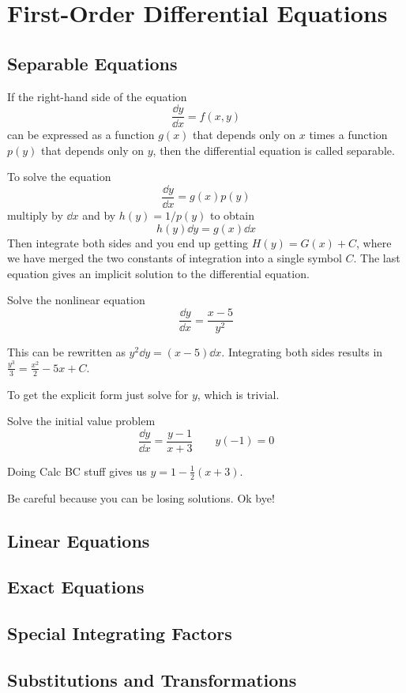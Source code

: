 \documentclass[../diffeq.tex]{subfiles}
\begin{document}
\chapter{First-Order Differential Equations}
\section{Separable Equations}
\begin{definition}
    If the right-hand side of the equation 
    \[ \frac{\dd y}{\dd x}=f(x,y) \]
    can be expressed as a function $g(x)$ that depends only on $x$ times a function $p(y)$ that depends only on $y$, then the differential equation is called separable.
\end{definition}

To solve the equation 
\[ \frac{\dd y}{\dd x}=g(x)p(y) \]
multiply by $\dd x$ and by $h(y)=1/p(y)$ to obtain 
\[h(y)\dd y=g(x)\dd x \]
Then integrate both sides and you end up getting $H(y)=G(x)+C$, where we have merged the two constants of integration into a single symbol $C$.
The last equation gives an implicit solution to the differential equation.

\begin{example}
    Solve the nonlinear equation 
    \[\frac{\dd y}{\dd x}=\frac{x-5}{y^2}\]

    This can be rewritten as $y^2\dd y = (x-5)\dd x$. Integrating both sides results in $\frac{y^3}{3}=\frac{x^2}{2}-5x+C$.

    To get the explicit form just solve for $y$, which is trivial.
\end{example}

\begin{example}
    Solve the initial value problem 
    \[ \frac{\dd y}{\dd x}=\frac{y-1}{x+3} \qquad y(-1)=0 \]

    Doing Calc BC stuff gives us $y=1-\frac{1}{2}(x+3)$.
\end{example}

Be careful because you can be losing solutions. Ok bye!

\section{Linear Equations}
\section{Exact Equations}
\section{Special Integrating Factors}
\section{Substitutions and Transformations}
\end{document}
